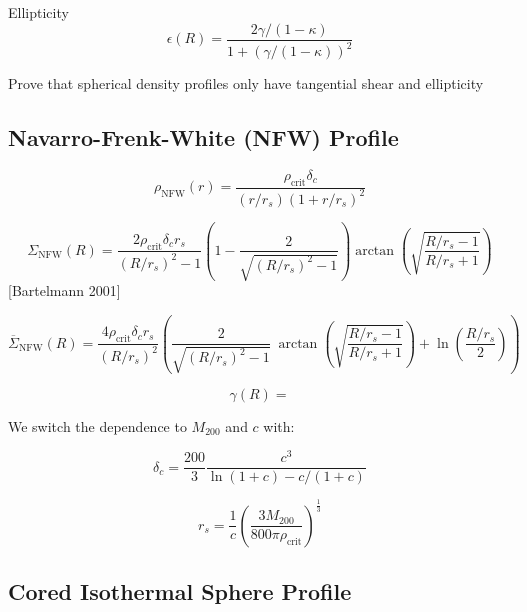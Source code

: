 \documentclass[]{article}
\begin{document}
Ellipticity
\begin{equation}
    \epsilon(R) = \frac{2 \gamma/(1 - \kappa)}{1 + (\gamma/(1 - \kappa))^2}
\end{equation}


Prove that spherical density profiles only have tangential shear and ellipticity

\newpage

\subsection{Navarro-Frenk-White (NFW) Profile}

\begin{equation}
    \rho_\mathrm{NFW}(r) = \frac{\rho_\mathrm{crit} \delta_c}{(r/r_s)\left(1 + r/r_s\right)^2}
\end{equation}

\begin{equation}
    \Sigma_\mathrm{NFW}(R) = \frac{2 \rho_\mathrm{crit} \delta_c r_s}{(R/r_s)^2 - 1} \left(1 - \frac{2}{\sqrt{(R/r_s)^2 - 1}} \right) \arctan\left(\sqrt{\frac{R/r_s - 1}{R/r_s + 1}} \right)
\end{equation}
[Bartelmann 2001]

\begin{equation}
    \overline{\Sigma}_\mathrm{NFW}(R) = \frac{4 \rho_\mathrm{crit} \delta_c r_s}{(R/r_s)^2} \left(
        \frac{2}{\sqrt{(R/r_s)^2 - 1}} ~\arctan\left(\sqrt{\frac{R/r_s - 1}{R/r_s + 1}} \right) + \ln{\left(\frac{R/r_s}{2}\right)}
    \right)
\end{equation}

\begin{equation}
    \gamma(R) =
\end{equation}

We switch the dependence to $M_{200}$ and $c$ with:

\begin{equation}
    \delta_c = \frac{200}{3} \frac{c^3}{\ln(1 + c) - c/(1 + c)}
\end{equation}

\begin{equation}
    r_s = \frac{1}{c} \left(\frac{3M_{200}}{800\pi \rho_\mathrm{crit}}\right)^\frac{1}{3}
\end{equation}

\subsection{Cored Isothermal Sphere Profile}
\end{document}
